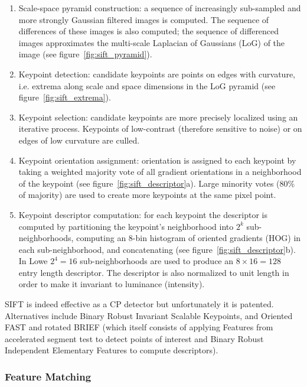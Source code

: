 \begin{enumerate}
    \item Scale-space pyramid construction: a sequence of increasingly sub-sampled and more strongly Gaussian filtered images is computed. The sequence of differences of these images is also computed; the sequence of differenced images approximates the multi-scale Laplacian of Gaussians (LoG) of the image (see figure~\ref{fig:sift_pyramid}).
    \item Keypoint detection: candidate keypoints are points on edges with curvature, i.e. extrema along scale and space dimensions in the LoG pyramid (see figure~\ref{fig:sift_extrema}).
    \item Keypoint selection: candidate keypoints are more precisely localized using an iterative process. Keypoints of low-contrast (therefore sensitive to noise) or on edges of low curvature are culled.
    \item Keypoint orientation assignment: orientation is assigned to each keypoint by taking a weighted majority vote of all gradient orientations in a neighborhood of the keypoint (see figure~\ref{fig:sift_descriptor}a). Large minority votes (80\% of majority) are used to create more keypoints at the same pixel point.
    \item Keypoint descriptor computation: for each keypoint the descriptor is computed by partitioning the keypoint's neighborhood into $2^k$ sub-neighborhoods, computing an 8-bin histogram of oriented gradients (HOG) in each sub-neighborhood, and concatenating (see figure~\ref{fig:sift_descriptor}b). In Lowe \etal\cite{lowe2004distinctive} $2^4=16$ sub-neighborhoods are used to produce an $8\times16 = 128$ entry length descriptor. The descriptor is also normalized to unit length in order to make it invariant to luminance (intensity).
\end{enumerate}
SIFT is indeed effective as a CP detector but unfortunately it is patented.
%
Alternatives include Binary Robust Invariant Scalable Keypoints\cite{leutenegger2011brisk}, and Oriented FAST and rotated BRIEF\cite{rublee2011orb} (which itself consists of applying Features from accelerated segment test\cite{rosten2006machine} to detect points of interest and Binary Robust Independent Elementary Features\cite{calonder2010brief} to compute descriptors).

\subsubsection{Feature Matching}

